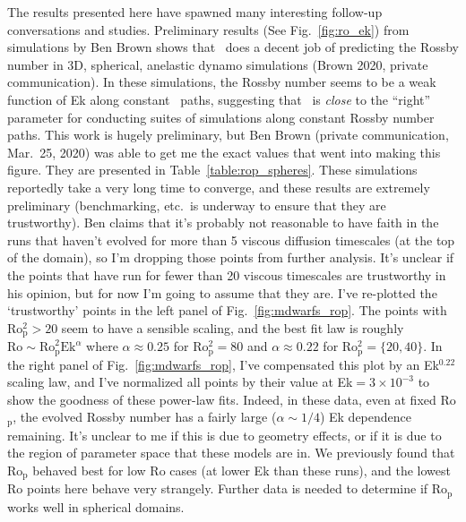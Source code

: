 The results presented here have spawned many interesting follow-up conversations and studies.
Preliminary results (See Fig.~\ref{fig:ro_ek}) from simulations by Ben Brown shows that \pro$\,$ does a decent job of predicting the Rossby number in 3D, spherical, anelastic dynamo simulations (Brown 2020, private communication).
In these simulations, the Rossby number seems to be a weak function of Ek along constant \pro$\,$ paths, suggesting that \pro$\,$ is \emph{close} to the ``right'' parameter for conducting suites of simulations along constant Rossby number paths.
This work is hugely preliminary, but Ben Brown (private communication, Mar.~25, 2020) was able to get me the exact values that went into making this figure.
They are presented in Table~\ref{table:rop_spheres}.
These simulations reportedly take a very long time to converge, and these results are extremely preliminary (benchmarking, etc.~is underway to ensure that they are trustworthy).
Ben claims that it's probably not reasonable to have faith in the runs that haven't evolved for more than 5 viscous diffusion timescales (at the top of the domain), so I'm dropping those points from further analysis.
It's unclear if the points that have run for fewer than 20 viscous timescales are trustworthy in his opinion, but for now I'm going to assume that they are.
I've re-plotted the `trustworthy' points in the left panel of Fig.~\ref{fig:mdwarfs_rop}.
The points with Ro$_\text{p}^2 > 20$ seem to have a sensible scaling, and the best fit law is roughly $\text{Ro} \sim \text{Ro}_\text{p}^2 \text{Ek}^\alpha$ where $\alpha \approx 0.25$ for Ro$_\text{p}^2 = 80$ and $\alpha \approx 0.22$ for Ro$_\text{p}^2 = \{20, 40\}$.
In the right panel of Fig.~\ref{fig:mdwarfs_rop}, I've compensated this plot by an Ek$^{0.22}$ scaling law, and I've normalized all points by their value at Ek$ = 3 \times 10^{-3}$ to show the goodness of these power-law fits.
Indeed, in these data, even at fixed Ro$_\text{p}$, the evolved Rossby number has a fairly large ($\alpha \sim 1/4$) Ek dependence remaining.
It's unclear to me if this is due to geometry effects, or if it is due to the region of parameter space that these models are in.
We previously found that Ro$_\text{p}$ behaved best for low Ro cases (at lower Ek than these runs), and the lowest Ro points here behave very strangely.
Further data is needed to determine if Ro$_{\text{p}}$ works well in spherical domains.

